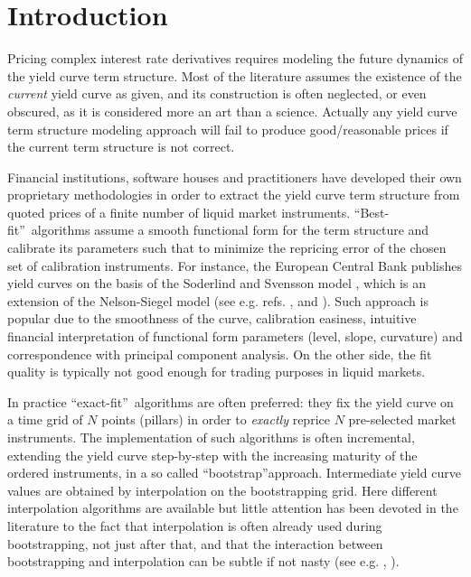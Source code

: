 \documentclass[11pt,reqno]{amsart}
\begin{document}
\section{Introduction}
\label{sec:Intro}
Pricing complex interest rate derivatives requires modeling the future dynamics of the yield curve term structure. Most of the literature assumes the existence of the \emph{current} yield curve as given, and its construction is often neglected, or even obscured, as it is considered more an art than a science. Actually any yield curve term structure modeling approach will fail to produce good/reasonable prices if the current term structure is not correct.
\par
Financial institutions, software houses and practitioners have developed their own proprietary methodologies in order to extract the yield curve term structure from quoted prices of a finite number of liquid market instruments.
\textquotedblleft Best-fit\textquotedblright\ algorithms assume a smooth functional form for the term structure and calibrate its parameters such that to minimize the repricing error of the chosen set of calibration instruments. For instance, the European Central Bank publishes yield curves on the basis of the Soderlind and Svensson model \cite{SodSwe1997}, which is an extension of the Nelson-Siegel model (see e.g. refs. \cite{NelSie1987}, \cite{ChrDie07} and \cite{Cor08}). Such approach is popular due to the smoothness of the curve, calibration easiness, intuitive financial interpretation of functional form parameters (level, slope, curvature) and correspondence with principal component analysis. On the other side, the fit quality is typically not good enough for trading purposes in liquid markets.
\par
In practice \textquotedblleft exact-fit\textquotedblright\ algorithms are often preferred: they fix the yield curve on a time grid of $N$ points (pillars) in order to \emph{exactly} reprice $N$ pre-selected market instruments. The implementation of such algorithms is often incremental, extending the yield curve step-by-step with the increasing maturity of the ordered instruments, in a so called \textquotedblleft bootstrap\textquotedblright approach. Intermediate yield curve values are obtained by interpolation on the bootstrapping grid. Here different interpolation algorithms are available but little attention has been devoted in the literature to the fact that interpolation is often already used during bootstrapping, not just after that, and that the interaction between bootstrapping and interpolation can be subtle if not nasty (see e.g. \cite{HagWes06}, \cite{HagWes08}).
\end{document}

